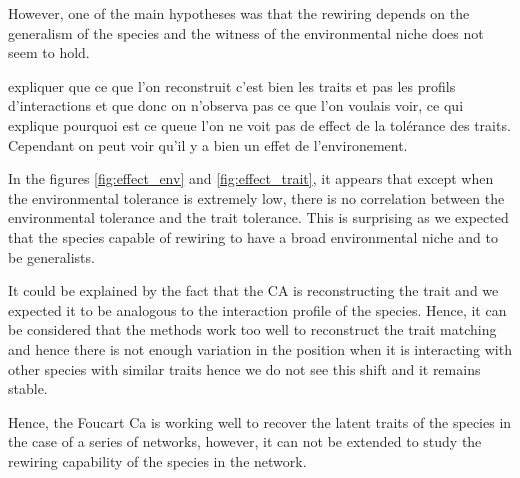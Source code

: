 However, one of the main hypotheses was that the rewiring depends on the generalism of the species and the witness of the environmental niche does not seem to hold.

expliquer que ce que l'on reconstruit c'est bien les traits et pas les profils d'interactions et que donc on n'observa pas ce que l'on voulais voir, ce qui explique pourquoi est ce queue l'on ne voit pas de effect de la tolérance des traits. Cependant on peut voir qu'il y a bien un effet de l'environement.




In the figures \ref{fig:effect_env} and \ref{fig:effect_trait}, it appears that except when the environmental tolerance is extremely low, there is no correlation between the environmental tolerance and the trait tolerance. This is surprising as we expected that the species capable of rewiring to have a broad environmental niche and to be generalists.

It could be explained by the fact that the CA is reconstructing the trait and we expected it to be analogous to the interaction profile of the species. Hence, it can be considered that the methods work too well to reconstruct the trait matching and hence there is not enough variation in the position when it is interacting with other species with similar traits hence we do not see this shift and it remains stable.

Hence, the Foucart Ca is working well to recover the latent traits of the species in the case of a series of networks, however, it can not be extended to study the rewiring capability of the species in the network. 